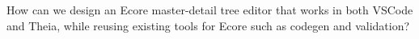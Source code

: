 How can we design an Ecore master-detail tree editor that works in both VSCode and Theia, while reusing existing tools for Ecore such as codegen and validation?